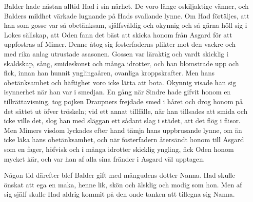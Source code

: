 Balder hade nästan alltid Had i sin närhet. De voro länge oskiljaktige
vänner, och Balders mildhet värkade lugnande på Hads svallande lynne. Om
Had förtäljes, att han som gosse var så obetänksam, själfsvåldig och
okynnig och så gärna höll sig i Lokes sällskap, att Oden fann det bäst
att skicka honom från Asgard för att uppfostras af Mimer. Denne åtog sig
fosterfaderns plikter mot den vackre och med rika anlag utrustade
asasonen. Gossen var läraktig och vardt skicklig i skaldskap, sång,
smideskonst och många idrotter, och han blomstrade upp och fick, innan
han hunnit ynglingaåren, ovanliga kroppskrafter. Men hans obetänksamhet
och häftighet voro icke lätta att bota. Okynnig visade han sig
isynnerhet när han var i smedjan. En gång när Sindre hade gifvit honom
en tillrättavisning, tog pojken Draupners frejdade smed i håret och drog
honom på det sättet ut öfver tröskeln; vid ett annat tillfälle, när han
tillsades att smida och icke ville det, slog han med släggan ett sådant
slag i städet, att det flög i flisor. Men Mimers visdom lyckades
\protect\hypertarget{lb1625905.xhtmlux5cux23start85}{}{}\protect\hypertarget{lb1625905.xhtmlux5cux23start85-a}{}{}\protect\hypertarget{lb1625905.xhtmlux5cux23start85-b}{}{}\protect\hypertarget{lb1625905.xhtmlux5cux23start85-c}{}{}\protect\hypertarget{lb1625905.xhtmlux5cux23start85-d}{}{}
efter hand tämja hans uppbrusande lynne, om än icke läka hans
obetänksamhet, och när fosterfadern återsändt honom till Asgard som en
fager, höfvisk och i många idrotter skicklig yngling, fick Oden honom
mycket kär, och var han af alla sina fränder i Asgard väl upptagen.

Någon tid därefter blef Balder gift med mångudens dotter Nanna. Had
skulle önskat att ega en maka, henne lik, skön och älsklig och modig som
hon. Men af sig själf skulle Had aldrig kommit på den onde tanken att
tillegna sig Nanna.

